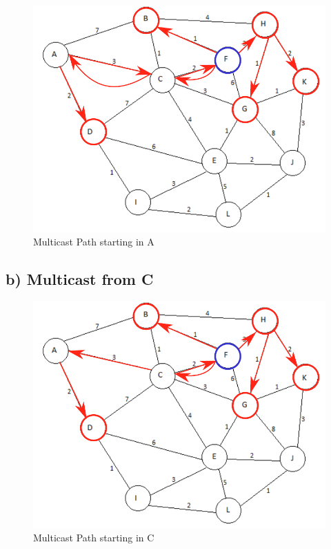 \documentclass[a4paper, 11 pt, article, accentcolor=tud7b]{tudreport}
\begin{document}
	\begin{figure}[h]
	  \centering
    \includegraphics[width=\textwidth/2]{graph-a.pdf}
    \caption{Multicast Path starting in A}
  \end{figure}
	
	\subsection*{b) Multicast from C}
	
	\begin{figure}[h]
	  \centering
    \includegraphics[width=\textwidth/2]{graph-b.pdf}
    \caption{Multicast Path starting in C}
  \end{figure}
	
	
\end{document}
